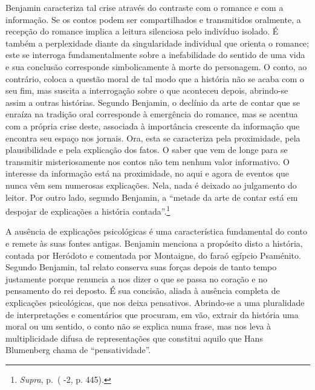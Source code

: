 Benjamin caracteriza tal crise através do contraste com o romance e com
a informação. Se os contos podem ser compartilhados e transmitidos
oralmente, a recepção do romance implica a leitura silenciosa pelo
indivíduo isolado. É também a perplexidade diante da singularidade
individual que orienta o romance; este se interroga fundamentalmente
sobre a inefabilidade do sentido de uma vida e sua conclusão corresponde
simbolicamente à morte do personagem. O conto, ao contrário, coloca a
questão moral de tal modo que a história não se acaba com o seu fim, mas
suscita a interrogação sobre o que aconteceu depois, abrindo-se assim a
outras histórias. Segundo Benjamin, o declínio da arte de contar que se
enraíza na tradição oral corresponde à emergência do romance, mas se
acentua com a própria crise deste, associada à importância crescente da
informação que encontra seu espaço nos jornais. Ora, esta se caracteriza
pela proximidade, pela plausibilidade e pela explicação dos fatos. O
saber que vem de longe para se transmitir misteriosamente nos contos não
tem nenhum valor informativo. O interesse da informação está na
proximidade, no aqui e agora de eventos que nunca vêm sem numerosas
explicações. Nela, nada é deixado ao julgamento do leitor. Por outro
lado, segundo Benjamin, a ``metade da arte de contar está em despojar de
explicações a história contada''.\footnote{\emph{Supra}, p.\,\pageref{supra3} ( -2,
  p. 445).}

A ausência de explicações psicológicas é uma característica fundamental
do conto e remete às suas fontes antigas. Benjamin menciona a propósito
disto a história, contada por Heródoto e comentada por Montaigne, do
faraó egípcio Psaménito. Segundo Benjamin, tal relato conserva suas
forças depois de tanto tempo justamente porque renuncia a nos dizer o
que se passa no coração e no pensamento do rei deposto. É sua concisão,
aliada à ausência completa de explicações psicológicas, que nos deixa
pensativos. Abrindo-se a uma pluralidade de interpretações e comentários
que procuram, em vão, extrair da história uma moral ou um sentido, o
conto não se explica numa frase, mas nos leva à multiplicidade difusa de
representações que constitui aquilo que Hans Blumenberg chama de
``pensatividade''.

